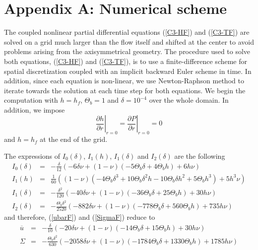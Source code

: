 \section*{Appendix A: Numerical scheme}\label{Numeric}

The coupled nonlinear partial differential equations (\ref{C3-HF}) and
(\ref{C3-TF}) are  solved on a grid much  larger than the
flow itself and  shifted at the center to avoid  problems arising from
the  axisymmetrical  geometry.   The  procedure  used  to  solve  both
equations,   (\ref{C3-HF})   and   (\ref{C3-TF}),    is   to   use   a
finite-difference scheme  for spatial  discretization coupled  with an
implicit  backward Euler  scheme  in time.   In  addition, since  each
equation is non-linear, we use Newton-Raphson method to iterate towards
the  solution at  each time  step for  both equations.   We begin  the
computation with  $h=h_f$, $\Theta_b =1$  and $\delta =  10^{-4}$ over
the whole domain. In addition, we impose
\begin{equation}
  \left.\frac{\partial h}{\partial r}\right|_{r=0} =\left.\frac{\partial P}{\partial r}\right|_{r=0} =0
\end{equation}
and $h=h_f$ at the end of the grid.

The   expressions  of   $I_0(\delta)$,   $I_1(h)$,  $I_1(\delta)$   and
$I_2(\delta)$ are the following
\begin{eqnarray}
  I_0(\delta)  &=&-  \frac{\delta}{12}  \left(-  6 \delta  \nu  +  (1-\nu)
                   \left(- 5 \Theta_{b} \delta  + 4 \Theta_{b} h\right) +
                   6 h \nu\right)\\
  I_1(h) &=&\frac{1}{60} \left((1-\nu) \left(- 4 \Theta_{b} \delta^{3} +
             10 \Theta_{b} \delta^{2} h - 10 \Theta_{b} \delta h^{2} +
             5 \Theta_{b} h^{3}\right) + 5 h^{3} \nu\right)\\
  I_1(\delta)  &=&- \frac{\delta^{2}}{120}  \left(-  40  \delta \nu  +
                  (1-\nu) \left(-  36 \Theta_{b} \delta +  25 \Theta_{b}
                   h\right) + 30 h \nu\right)\\
I_2(\delta)&=&- \frac{\Theta_{b} \delta^{2}}{2520}  \left(- 882 \delta
               \nu  +  (1-\nu)  \left(-  778  \Theta_{b}  \delta  +  560
               \Theta_{b} h\right) + 735 h \nu\right)
\end{eqnarray}
and therefore, (\ref{ubarF}) and (\ref{SigmaF}) reduce to 
\begin{eqnarray}
\overline{u}&=&-  \frac{\delta}{10}  \left(-  20  \delta   \nu  +  (1-\nu)  \left(-  14
  \Theta_{b} \delta + 15 \Theta_{b} h\right) + 30 h \nu\right)\\
\Sigma &=&- \frac{\Theta_{b} \delta^{2}}{630} \left(- 2058 \delta \nu + (1-\nu) \left(- 1784 \Theta_{b} \delta + 1330 \Theta_{b} h\right) + 1785 h \nu\right)
\end{eqnarray}

